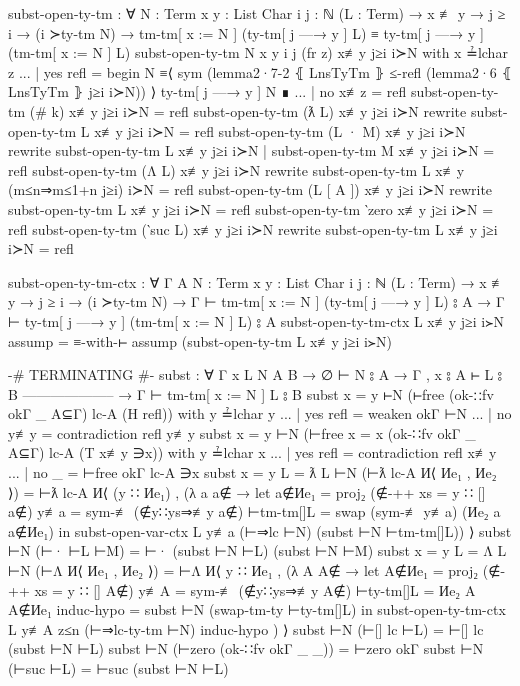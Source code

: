 \documentclass[logo,bsc,singlespacing,parskip,online]{infthesis}
\renewenvironment{code}{\mintedcopy[breaklines,breaksymbolleft=\;]{agda}}{\endmintedcopy}
\begin{document}
\begin{code}
  subst-open-ty-tm : ∀ {N : Term} {x y : List Char} {i j : ℕ}
    (L : Term)
    → x ≢ y
    → j ≥ i
    → (i ≻ty-tm N)
    → tm-tm[ x := N ] (ty-tm[ j —→ y ] L)
      ≡ ty-tm[ j —→ y ] (tm-tm[ x := N ] L)
  subst-open-ty-tm {N} {x} {y} {i} {j} (fr z) x≢y j≥i i≻N with x ≟lchar z
  ... | yes refl = 
    begin
      N
    ≡⟨ sym (lemma2·7-2 ⦃ LnsTyTm ⦄ ≤-refl (lemma2·6 ⦃ LnsTyTm ⦄ j≥i i≻N)) ⟩
      ty-tm[ j —→ y ] N
    ∎
  ... | no  x≢z  = refl
  subst-open-ty-tm (# k) x≢y j≥i i≻N = refl
  subst-open-ty-tm (ƛ L) x≢y j≥i i≻N
    rewrite subst-open-ty-tm L x≢y j≥i i≻N = refl
  subst-open-ty-tm (L · M) x≢y j≥i i≻N
    rewrite subst-open-ty-tm L x≢y j≥i i≻N
    | subst-open-ty-tm M x≢y j≥i i≻N
    = refl
  subst-open-ty-tm (Λ L) x≢y j≥i i≻N
    rewrite subst-open-ty-tm L x≢y (m≤n⇒m≤1+n j≥i) i≻N = refl
  subst-open-ty-tm (L [ A ]) x≢y j≥i i≻N
    rewrite subst-open-ty-tm L x≢y j≥i i≻N = refl
  subst-open-ty-tm ‵zero x≢y j≥i i≻N = refl
  subst-open-ty-tm (‵suc L) x≢y j≥i i≻N rewrite
    subst-open-ty-tm L x≢y j≥i i≻N = refl

  subst-open-ty-tm-ctx : ∀ {Γ A} {N : Term} {x y : List Char} {i j : ℕ}
    (L : Term)
    → x ≢ y
    → j ≥ i
    → (i ≻ty-tm N)
    → Γ ⊢ tm-tm[ x := N ] (ty-tm[ j —→ y ] L) ⦂ A
    → Γ ⊢ ty-tm[ j —→ y ] (tm-tm[ x := N ] L) ⦂ A
  subst-open-ty-tm-ctx L x≢y j≥i i≻N assump = ≡-with-⊢ assump (subst-open-ty-tm L x≢y j≥i i≻N)

  {-# TERMINATING #-}
  subst : ∀ {Γ x L N A B}
    → ∅ ⊢ N ⦂ A
    → Γ , x ⦂ A ⊢ L ⦂ B
      --------------------
    → Γ ⊢ tm-tm[ x := N ] L ⦂ B
  subst {x = y} ⊢N (⊢free (ok-∷fv okΓ _ A⊆Γ) lc-A (H refl)) with y ≟lchar y
  ... | yes refl = weaken okΓ ⊢N
  ... | no  y≢y  = contradiction refl y≢y
  subst {x = y} ⊢N (⊢free {x = x} (ok-∷fv okΓ _ A⊆Γ) lc-A (T x≢y ∋x)) with y ≟lchar x
  ... | yes refl = contradiction refl x≢y
  ... | no  _    = ⊢free okΓ lc-A ∋x
  subst {x = y} {L = ƛ L} ⊢N (⊢ƛ lc-A И⟨ Иe₁ , Иe₂ ⟩) =
    ⊢ƛ lc-A И⟨ (y ∷ Иe₁) , (λ a {a∉} → 
      let a∉Иe₁ = proj₂ (∉-++ {xs = y ∷ []} a∉)
          y≢a = sym-≢ (∉y∷ys⇒≢y a∉)
          ⊢tm-tm[]L = swap (sym-≢ y≢a) (Иe₂ a {a∉Иe₁})
      in subst-open-var-ctx L y≢a (⊢⇒lc ⊢N) (subst ⊢N ⊢tm-tm[]L)) ⟩
  subst ⊢N (⊢· ⊢L ⊢M) = ⊢· (subst ⊢N ⊢L) (subst ⊢N ⊢M)
  subst {x = y} {L = Λ L} ⊢N (⊢Λ И⟨ Иe₁ , Иe₂ ⟩) =
    ⊢Λ И⟨ y ∷ Иe₁ , (λ A {A∉} →
      let A∉Иe₁ = proj₂ (∉-++ {xs = y ∷ []} A∉)
          y≢A = sym-≢ (∉y∷ys⇒≢y A∉)
          ⊢ty-tm[]L = Иe₂ A {A∉Иe₁}
          induc-hypo = subst ⊢N (swap-tm-ty ⊢ty-tm[]L)
      in subst-open-ty-tm-ctx L y≢A z≤n (⊢⇒lc-ty-tm ⊢N) induc-hypo ) ⟩
  subst ⊢N (⊢[] lc ⊢L) = ⊢[] lc (subst ⊢N ⊢L)
  subst ⊢N (⊢zero (ok-∷fv okΓ _ _)) = ⊢zero okΓ
  subst ⊢N (⊢suc ⊢L) = ⊢suc (subst ⊢N ⊢L)


\end{code}
\end{document}
